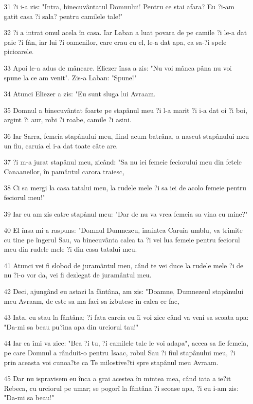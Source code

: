 \par 31 ?i i-a zis: "Intra, binecuvântatul Domnului! Pentru ce stai afara? Eu ?i-am gatit casa ?i sala? pentru camilele tale!"
\par 32 ?i a intrat omul acela în casa. Iar Laban a luat povara de pe camile ?i le-a dat paie ?i fân, iar lui ?i oamenilor, care erau cu el, le-a dat apa, ca sa-?i spele picioarele.
\par 33 Apoi le-a adus de mâncare. Eliezer însa a zis: "Nu voi mânca pâna nu voi spune la ce am venit". Zis-a Laban: "Spune!"
\par 34 Atunci Eliezer a zis: "Eu sunt sluga lui Avraam.
\par 35 Domnul a binecuvântat foarte pe stapânul meu ?i l-a marit ?i i-a dat oi ?i boi, argint ?i aur, robi ?i roabe, camile ?i asini.
\par 36 Iar Sarra, femeia stapânului meu, fiind acum batrâna, a nascut stapânului meu un fiu, caruia el i-a dat toate câte are.
\par 37 ?i m-a jurat stapânul meu, zicând: "Sa nu iei femeie feciorului meu din fetele Canaaneilor, în pamântul carora traiesc,
\par 38 Ci sa mergi la casa tatalui meu, la rudele mele ?i sa iei de acolo femeie pentru feciorul meu!"
\par 39 Iar eu am zis catre stapânul meu: "Dar de nu va vrea femeia sa vina cu mine?"
\par 40 El însa mi-a raspuns: "Domnul Dumnezeu, înaintea Caruia umblu, va trimite cu tine pe îngerul Sau, va binecuvânta calea ta ?i vei lua femeie pentru feciorul meu din rudele mele ?i din casa tatalui meu.
\par 41 Atunci vei fi slobod de juramântul meu, când te vei duce la rudele mele ?i de nu ?i-o vor da, vei fi dezlegat de juramântul meu.
\par 42 Deci, ajungând eu astazi la fântâna, am zis: "Doamne, Dumnezeul stapânului meu Avraam, de este sa ma faci sa izbutesc în calea ce fac,
\par 43 Iata, eu stau la fântâna; ?i fata careia eu îi voi zice când va veni sa scoata apa: "Da-mi sa beau pu?ina apa din urciorul tau!"
\par 44 Iar ea îmi va zice: "Bea ?i tu, ?i camilele tale le voi adapa", aceea sa fie femeia, pe care Domnul a rânduit-o pentru Isaac, robul Sau ?i fiul stapânului meu, ?i prin aceasta voi cunoa?te ca Te milostive?ti spre stapânul meu Avraam.
\par 45 Dar nu ispravisem eu înca a grai acestea în mintea mea, când iata a ie?it Rebeca, cu urciorul pe umar; se pogorî la fântâna ?i scoase apa, ?i eu i-am zis: "Da-mi sa beau!"
